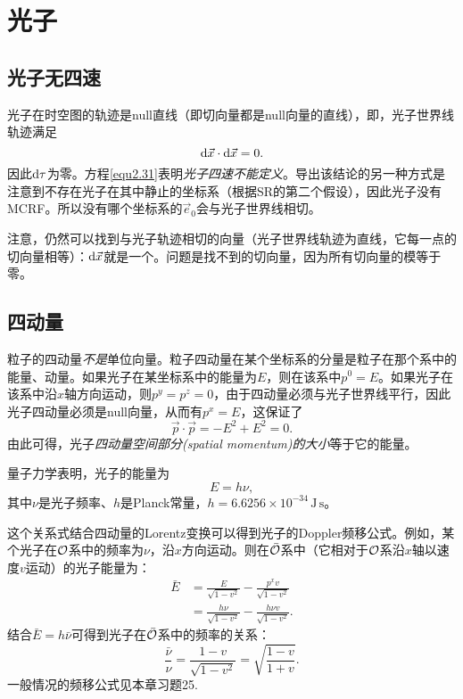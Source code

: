 \section{光子}
\label{sec2.7}
\subsection*{光子无四速}
光子在时空图的轨迹是null直线（即切向量都是null向量的直线），即，光子世界线轨迹满足
\begin{equation}
    \mathrm{d} \vec{x} \cdot \mathrm{d} \vec{x} = 0.
\label{equ2.36}
\end{equation}
因此$\mathrm{d} \tau$为零。方程\eqref{equ2.31}表明\textit{光子四速不能定义}。导出该结论的另一种方式是注意到不存在光子在其中静止的坐标系（根据SR的第二个假设），因此光子没有MCRF。所以没有哪个坐标系的$\vec{e}_0$会与光子世界线相切。

注意，仍然可以找到与光子轨迹相切的向量（光子世界线轨迹为直线，它每一点的切向量相等）：$\mathrm{d} \vec{x}$就是一个。问题是找不到的切向量，因为所有切向量的模等于零。

\subsection*{四动量}
粒子的四动量\textit{不是}单位向量。粒子四动量在某个坐标系的分量是粒子在那个系中的能量、动量。如果光子在某坐标系中的能量为$E$，则在该系中$p^0 = E$。如果光子在该系中沿$x$轴方向运动，则$p^y = p^z = 0$，由于四动量必须与光子世界线平行，因此光子四动量必须是null向量，从而有$p^x = E$，这保证了
\begin{equation}
    \vec{p} \cdot \vec{p} = -E^2 + E^2 = 0.
\label{equ2.37}
\end{equation}
由此可得，光子\textit{四动量空间部分(spatial momentum)的大小}等于它的能量。

量子力学表明，光子的能量为
\begin{equation}
    E = h\nu,
\label{equ2.38}
\end{equation}
其中$\nu$是光子频率、$h$是Planck常量，$h = 6.6256 \times 10^{-34} \, \mathrm{J \, s}$。

这个关系式结合四动量的Lorentz变换可以得到光子的Doppler频移公式。例如，某个光子在$\mathcal{O}$系中的频率为$\nu$，沿$x$方向运动。则在$\bar{\mathcal{O}}$系中（它相对于$\mathcal{O}$系沿$x$轴以速度$v$运动）的光子能量为：
\begin{align*}
    \bar{E} &= \frac{E}{\sqrt{1 - v^2}} - \frac{p^x v}{\sqrt{1 - v^2}} \\
    &= \frac{h \nu}{\sqrt{1 - v^2}} - \frac{h\nu v}{\sqrt{1 - v^2}}.
\end{align*}
结合$\bar{E} = h\bar{\nu}$可得到光子在$\bar{\mathcal{O}}$系中的频率的关系：
\begin{equation}
    \frac{\bar{\nu}}{\nu} = \frac{1 - v}{\sqrt{1 - v^2}} = \sqrt{ \frac{1 - v}{1 + v} }.
\label{equ2.39}
\end{equation}
一般情况的频移公式见本章习题25.


